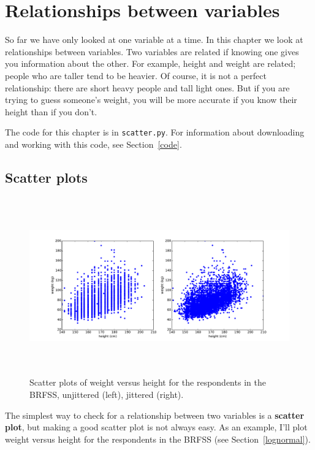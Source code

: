 \documentclass[12pt]{book}
\begin{document}
\chapter{Relationships between variables}

So far we have only looked at one variable at a time.  In this
chapter we look at relationships between variables.  Two variables are
related if knowing one gives you information about the other.  For
example, height and weight are related; people who are taller tend to
be heavier.  Of course, it is not a perfect relationship: there
are short heavy people and tall light ones.  But if you are
trying to guess someone's weight, you will be more accurate if you
know their height than if you don't.

The code for this chapter is in {\tt scatter.py}.
For information about downloading and
working with this code, see Section~\ref{code}.


\section{Scatter plots}

\begin{figure}
\centerline{\includegraphics[height=3.0in]{figs/scatter1.pdf}}
\caption{Scatter plots of weight versus height for the respondents
in the BRFSS, unjittered (left), jittered (right).}
\label{scatter1}
\end{figure}

The simplest way to check for a relationship between two variables
is a {\bf scatter plot}, but making a good scatter plot is not always easy.
As an example, I'll plot weight versus height for the respondents
in the BRFSS (see Section~\ref{lognormal}).
\end{document}
